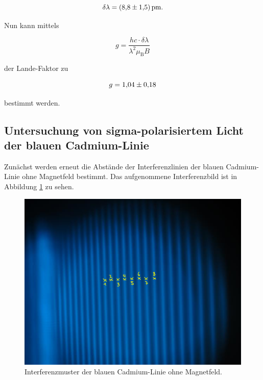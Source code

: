 \begin{equation*}
    \delta \lambda = \SI{8.8+-1.5}{\pico\metre}.
\end{equation*}

Nun kann mittels 

\begin{equation}
    g = \frac{hc\cdot\delta\lambda}{\lambda^2\mu_\text{B}B}
\end{equation}

der Lande-Faktor zu 

\begin{equation*}
    g = \num{1.04+-0.18}
\end{equation*}

bestimmt werden. 

\subsection{Untersuchung von sigma-polarisiertem Licht der blauen Cadmium-Linie}

Zunächst werden erneut die Abstände der Interferenzlinien der blauen Cadmium-Linie ohne Magnetfeld bestimmt. Das
aufgenommene Interferenzbild ist in Abbildung \ref{fig:blau_ohne} zu sehen. 

\begin{figure}
    \centering
    \includegraphics[scale=0.35]{content/blau_ohne.png}
    \vspace{-10pt}
    \caption{Interferenzmuster der blauen Cadmium-Linie ohne Magnetfeld.}
    \label{fig:blau_ohne}
\end{figure}

